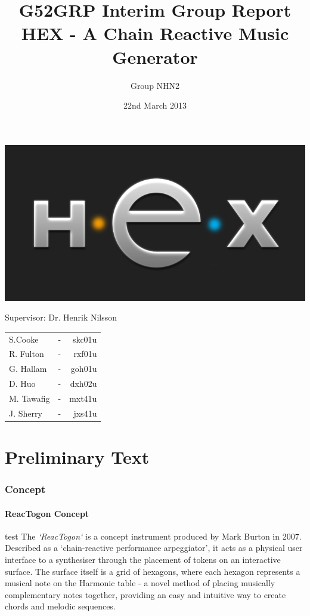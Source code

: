 \documentclass[10pt,a4paper]{article}
\begin{document}
\begin{titlepage}
\title{G52GRP Interim Group Report\\HEX - A Chain Reactive Music Generator }
\author{Group NHN2}
\includegraphics[scale=0.6]{hexlogo.png}
\date{22nd March 2013}
\maketitle
\thispagestyle{empty}
\begin{center}
Supervisor: Dr. Henrik Nilsson\\
\bigskip
\begin{tabular}{ l c r }
  S.Cooke & - & skc01u \\
  R. Fulton & - & rxf01u \\
  G. Hallam & - & goh01u \\
  D. Huo & - & dxh02u \\
  M. Tawafig & - & mxt41u \\
  J. Sherry & - & jxs41u \\  
\end{tabular}
\end{center}
\end{titlepage}

\tableofcontents
\pagebreak

\part{Preliminary Text}
\section{Concept}
\subsection{ReacTogon Concept}
test
The \textit{`ReacTogon`}\cite{modin} is a concept instrument produced by Mark Burton in 2007. Described as a `chain-reactive performance arpeggiator’, it acts as a physical user interface to a synthesiser through the placement of tokens on an interactive surface. The surface itself is a grid of hexagons, where each hexagon represents a musical note on the Harmonic table\cite{wikipediaHarmTab} - a novel method of placing musically complementary notes together, providing an easy and intuitive way to create chords and melodic sequences.\\
\end{document}

